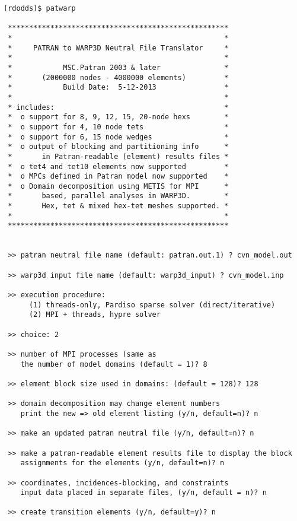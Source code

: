 \documentclass[11pt]{report}
\numberwithin{equation}{section}
\begin{document}
\small
\begin{verbatim}
[rdodds]$ patwarp

 ****************************************************
 *                                                  *
 *     PATRAN to WARP3D Neutral File Translator     *
 *                                                  *
 *            MSC.Patran 2003 & later               *
 *       (2000000 nodes - 4000000 elements)         *
 *            Build Date:  5-12-2013                *
 *                                                  *
 * includes:                                        *
 *  o support for 8, 9, 12, 15, 20-node hexs        *
 *  o support for 4, 10 node tets                   *
 *  o support for 6, 15 node wedges                 *
 *  o output of blocking and partitioning info      *
 *       in Patran-readable (element) results files *
 *  o tet4 and tet10 elements now supported         *
 *  o MPCs defined in Patran model now supported    *
 *  o Domain decomposition using METIS for MPI      *
 *       based, parallel analyses in WARP3D.        *
 *       Hex, tet & mixed hex-tet meshes supported. *
 *                                                  *
 ****************************************************


 >> patran neutral file name (default: patran.out.1) ? cvn_model.out

 >> warp3d input file name (default: warp3d_input) ? cvn_model.inp

 >> execution procedure: 
      (1) threads-only, Pardiso sparse solver (direct/iterative)
      (2) MPI + threads, hypre solver 

 >> choice: 2

 >> number of MPI processes (same as
    the number of model domains (default = 1)? 8

 >> element block size used in domains: (default = 128)? 128

 >> domain decomposition may change element numbers
    print the new => old element listing (y/n, default=n)? n

 >> make an updated patran neutral file (y/n, default=n)? n

 >> make a patran-readable element results file to display the block
    assignments for the elements (y/n, default=n)? n

 >> coordinates, incidences-blocking, and constraints
    input data placed in separate files, (y/n, default = n)? n

 >> create transition elements (y/n, default=y)? n


\end{verbatim}
\end{document}
